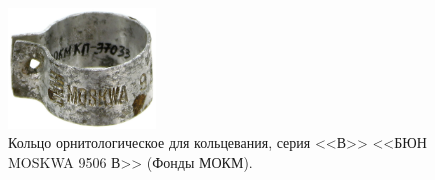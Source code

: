 \begin{figure}
\begin{changemargin}{-1.5cm}{0cm}
    \begin{center}
    \includegraphics[width=0.35\textwidth]{authors/usupova-fig-3.jpg}
  \end{center}
  \caption{Кольцо орнитологическое для кольцевания, серия <<В>> <<БЮН MOSKWA 9506 В>> (Фонды МОКМ).}
  \label{fig:usupova-fig-3}
  \end{changemargin}
\end{figure}
